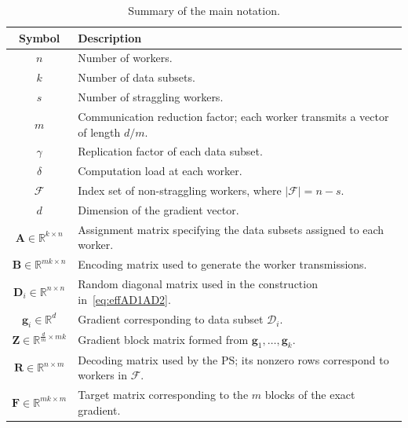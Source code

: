 \documentclass[journal,draftcls,onecolumn]{IEEEtran}
\theoremstyle{mystyle}
\begin{document}
\begin{table}[!h]
\centering
\caption{Summary of the main notation.}
\label{tab:notation}
\renewcommand{\arraystretch}{1.12}
\begin{tabular}{@{}c p{}@{}}
\hline
\textbf{Symbol} & \textbf{Description} \\
\hline
$n$ & Number of workers. \\

$k$ & Number of data subsets. \\

$s$ & Number of straggling workers. \\

$m$ & Communication reduction factor; each worker transmits a vector of length $d/m$. \\

$\gamma$ & Replication factor of each data subset. \\

$\delta$ & Computation load at each worker. \\

$\mathcal{F}$ & Index set of non-straggling workers, where $|\mathcal{F}|=n-s$. \\

$d$ & Dimension of the gradient vector. \\


$\mathbf{A}\in\mathbb{R}^{k\times n}$ &
Assignment matrix specifying the data subsets assigned to each worker. \\

$\mathbf{B}\in\mathbb{R}^{mk\times n}$ &
Encoding matrix used to generate the worker transmissions. \\

$\mathbf{D}_i\in\mathbb{R}^{n\times n}$ &
Random diagonal matrix used in the construction in~\eqref{eq:effAD1AD2}. \\

$\mathbf{g}_i\in\mathbb{R}^{d}$ &
Gradient corresponding to data subset $\mathcal{D}_i$. \\
$\mathbf{Z}\in\mathbb{R}^{\frac{d}{m}\times mk}$ &
Gradient block matrix formed from $\mathbf{g}_1,\ldots,\mathbf{g}_k$. \\

$\mathbf{R}\in\mathbb{R}^{n\times m}$ &
Decoding matrix used by the PS; its nonzero rows correspond to workers in $\mathcal{F}$. \\

$\mathbf{F}\in\mathbb{R}^{mk\times m}$ &
Target matrix corresponding to the $m$ blocks of the exact gradient. \\
\hline
\end{tabular}
\end{table}
\end{document}
